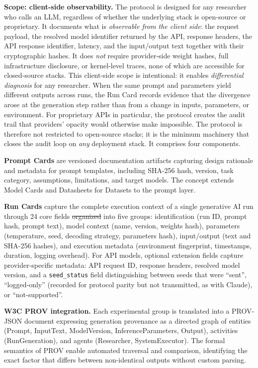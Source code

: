 \documentclass[sn-nature]{sn-jnl}
\makeatletter
\providecommand{\DIFadd}[1]{{\protect\color{blue}\uwave{#1}}} %
\providecommand{\DIFdel}[1]{{\protect\color{red}\sout{#1}}} %
\providecommand{\DIFaddbegin}{} %
\providecommand{\DIFaddend}{} %
\providecommand{\DIFdelbegin}{} %
\providecommand{\DIFdelend}{} %
\providecommand{\DIFscaledelfig}{0.5}
\newlength{\DIFdelgraphicswidth} %
\newlength{\DIFdelgraphicsheight} %
\providecommand{\DIFaddincludegraphics}[2][]{{\color{blue}\fbox{\DIFOincludegraphics[#1]{#2}}}} %
\providecommand{\DIFdelincludegraphics}[2][]{%
\sbox{\DIFdelgraphicsbox}{\DIFOincludegraphics[#1]{#2}}%
\settoboxwidth{\DIFdelgraphicswidth}{\DIFdelgraphicsbox} %
\settoboxtotalheight{\DIFdelgraphicsheight}{\DIFdelgraphicsbox} %
\scalebox{\DIFscaledelfig}{%
\parbox[b]{\DIFdelgraphicswidth}{\usebox{\DIFdelgraphicsbox}\\[-\baselineskip] \rule{\DIFdelgraphicswidth}{0em}}\llap{\resizebox{\DIFdelgraphicswidth}{\DIFdelgraphicsheight}{%
\setlength{\unitlength}{\DIFdelgraphicswidth}%
\begin{picture}(1,1)%
\thicklines\linethickness{2pt} %
{\color[rgb]{1,0,0}\put(0,0){\framebox(1,1){}}}%
{\color[rgb]{1,0,0}\put(0,0){\line( 1,1){1}}}%
{\color[rgb]{1,0,0}\put(0,1){\line(1,-1){1}}}%
\end{picture}%
}\hspace*{3pt}}} %
} %
\DeclareRobustCommand{\DIFaddbegin}{\DIFOaddbegin \let\includegraphics\DIFaddincludegraphics} %
\DeclareRobustCommand{\DIFaddend}{\DIFOaddend \let\includegraphics\DIFOincludegraphics} %
\DeclareRobustCommand{\DIFdelbegin}{\DIFOdelbegin \let\includegraphics\DIFdelincludegraphics} %
\DeclareRobustCommand{\DIFdelend}{\DIFOaddend \let\includegraphics\DIFOincludegraphics} %
\let\sout@orig\sout %
\renewcommand{\sout}[1]{\ifmmode\text{\sout@orig{\ensuremath{#1}}}\else\sout@orig{#1}\fi} %
\makeatother
\begin{document}
\textbf{Scope: client-side observability.}
The protocol is designed for any researcher who calls an LLM, regardless of whether the underlying stack is open-source or proprietary.
It documents what is \emph{observable from the client side}: the request payload, the resolved model identifier returned by the API, response headers, the API response identifier, latency, and the input/output text together with their cryptographic hashes.
It does \emph{not} require provider-side weight hashes, full infrastructure disclosure, or kernel-level traces, none of which are accessible for closed-source stacks.
This client-side scope is intentional: it enables \emph{differential diagnosis} for any researcher.
When the same prompt and parameters yield different outputs across runs, the Run Card records evidence that the divergence arose at the generation step rather than from a change in inputs, parameters, or environment.
For proprietary APIs in particular, the protocol creates the audit trail that providers' opacity would otherwise make impossible.
The protocol is therefore not restricted to open-source stacks; it is the minimum machinery that closes the audit loop on \emph{any} deployment stack.
It comprises four components.

\textbf{Prompt Cards} are versioned documentation artifacts capturing design rationale and metadata for prompt templates, including SHA-256 hash, version, task category, assumptions, limitations, and target models.
The concept extends Model Cards\cite{mitchell2019model} and Datasheets for Datasets\cite{gebru2021datasheets} to the prompt layer.

\textbf{Run Cards} capture the complete execution context of a single generative AI run through 24 core fields \DIFdelbegin \DIFdel{organized }\DIFdelend \DIFaddbegin \DIFadd{organised }\DIFaddend into five groups: identification (run ID, prompt hash, prompt text), model context (name, version, weights hash), parameters (temperature, seed, decoding strategy, parameters hash), input/output (text and SHA-256 hashes), and execution metadata (environment fingerprint, timestamps, duration, logging overhead).
For API models, optional extension fields capture provider-specific metadata: API request ID, response headers, resolved model version, and a \texttt{seed\_status} field distinguishing between seeds that were ``sent'', ``logged-only'' (recorded for protocol parity but not transmitted, as with Claude), or ``not-supported''.

\textbf{W3C PROV integration.}
Each experimental group is translated into a PROV-JSON document\cite{w3cprov2013} expressing generation provenance as a directed graph of entities (Prompt, InputText, ModelVersion, InferenceParameters, Output), activities (RunGeneration), and agents (Researcher, SystemExecutor).
The formal semantics of PROV enable automated traversal and comparison, identifying the exact factor that differs between non-identical outputs without custom parsing.
\end{document}
